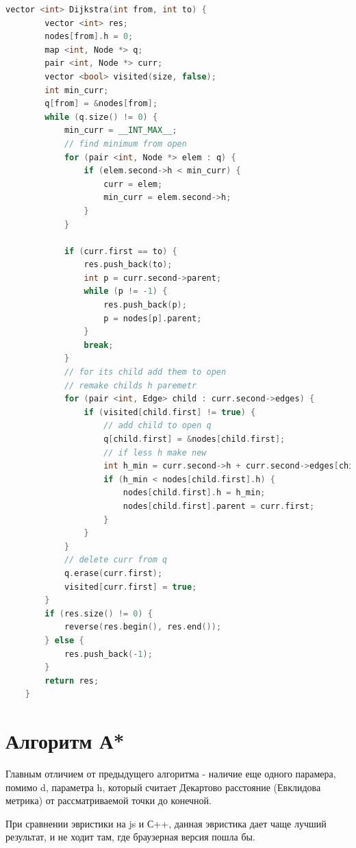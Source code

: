 \begin{lstlisting}[language=C++]
vector <int> Dijkstra(int from, int to) {
        vector <int> res;
        nodes[from].h = 0;
        map <int, Node *> q;
        pair <int, Node *> curr;
        vector <bool> visited(size, false);
        int min_curr;
        q[from] = &nodes[from];
        while (q.size() != 0) {
            min_curr = __INT_MAX__;
            // find minimum from open
            for (pair <int, Node *> elem : q) {
                if (elem.second->h < min_curr) {
                    curr = elem;
                    min_curr = elem.second->h;
                }
            }

            if (curr.first == to) {
                res.push_back(to);
                int p = curr.second->parent;
                while (p != -1) {
                    res.push_back(p);
                    p = nodes[p].parent;
                }
                break;
            }
            // for its child add them to open
            // remake childs h paremetr
            for (pair <int, Edge> child : curr.second->edges) {
                if (visited[child.first] != true) {
                    // add child to open q
                    q[child.first] = &nodes[child.first];
                    // if less h make new
                    int h_min = curr.second->h + curr.second->edges[child.first].waight;
                    if (h_min < nodes[child.first].h) {
                        nodes[child.first].h = h_min;
                        nodes[child.first].parent = curr.first;
                    }
                }
            }
            // delete curr from q
            q.erase(curr.first);
            visited[curr.first] = true;
        }
        if (res.size() != 0) {
            reverse(res.begin(), res.end());
        } else {
            res.push_back(-1);
        }
        return res;
    }
\end{lstlisting}


\pagebreak

\section{Алгоритм А*}

Главным отличием от предыдущего алгоритма - наличие еще одного парамера, помимо d, параметра h, который считает Декартово расстояние (Евклидова метрика) от рассматриваемой точки до конечной.

При сравнении эвристики на js и С++, данная эвристика дает чаще лучший результат, и не ходит там, где браузерная версия пошла бы.

